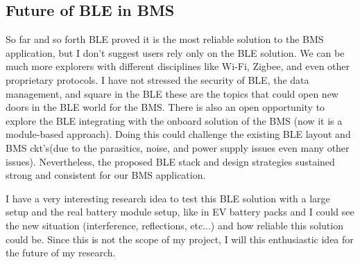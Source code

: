 \subsection{Future of BLE in BMS}
So far and so forth BLE proved it is the most reliable solution to the BMS application, but I don't suggest users rely only on the BLE solution. We can be much more explorers with different disciplines like Wi-Fi, Zigbee, and even other proprietary protocols.
I have not stressed the security of BLE, the data management, and square in the BLE these are the topics that could open new doors in the BLE world for the BMS. There is also an open opportunity to explore the BLE integrating with the onboard solution of the BMS (now it is a module-based approach). Doing this could challenge the existing BLE layout and BMS ckt's(due to the parasitics, noise, and power supply issues even many other issues). Nevertheless, the proposed BLE stack and design strategies sustained strong and consistent for our BMS application.

I have a very interesting research idea to test this BLE solution with a large setup and the real battery module setup, like in EV battery packs and I could see the new situation (interference, reflections, etc...) and how reliable this solution could be. Since this is not the scope of my project, I will this enthusiastic idea for the future of my research.
